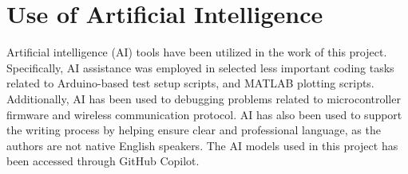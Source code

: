 \section*{Use of Artificial Intelligence}

Artificial intelligence (AI) tools have been utilized in the work of this project. Specifically, AI assistance was employed in selected less important coding tasks related to Arduino-based test setup scripts, and MATLAB plotting scripts. Additionally, AI has been used to debugging problems related to microcontroller firmware and wireless communication protocol.
AI has also been used to support the writing process by helping ensure clear and professional language, as the authors are not native English speakers.
The AI models used in this project has been accessed through GitHub Copilot.